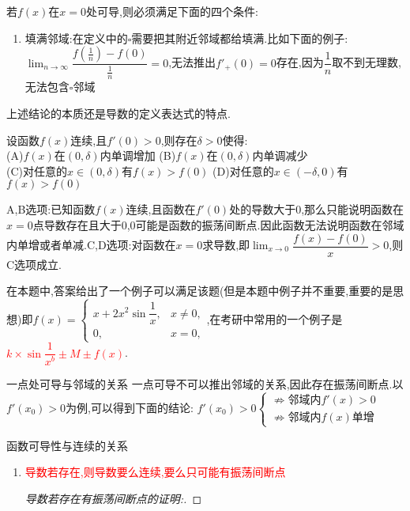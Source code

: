 \documentclass[8pt a4paper, oneside, UTF8]{ctexbook}  %
\begin{document}
\begin{sloppypar}
\begin{conclusion}{若$f(x)$在$x=0$处可导,则必须满足下面的四个条件:}{}
\begin{enumerate}
            \item 填满邻域:在定义中的$\square$需要把其附近邻域都给填满.比如下面的例子:$\lim_{n\to \infty}\dfrac{f(\frac{1}{n})-f(0)}{\frac{1}{n}}=0$,无法推出$f'_+(0)=0$存在,因为$\dfrac{1}{n}$取不到无理数,无法包含$\square$邻域
        \end{enumerate}
        上述结论的本质还是导数的定义表达式的特点.
    \end{conclusion}
    \begin{problem}
    设函数$f(x)$连续,且$f'(0)>0$,则存在$\delta >0 $使得:\\
    (A)$f(x)$在$(0,\delta)$内单调增加 \quad (B)$f(x)$在$(0,\delta)$内单调减少\\
    (C)对任意的$x \in (0,\delta)$有$f(x)>f(0)$ \quad    (D)对任意的$x\in (-\delta,0)$有$f(x)>f(0)$
    \end{problem}
    \begin{solution}
        A,B选项:已知函数$f(x)$连续,且函数在$f'(0)$处的导数大于0,那么只能说明函数在$x=0$点导数存在且大于0,0可能是函数的振荡间断点.因此函数无法说明函数在邻域内单增或者单减.C,D选项:对函数在$x=0$求导数,即$\lim_{x\to 0} \dfrac{f(x)-f(0)}{x}>0$,则C选项成立.
    \end{solution}
    \begin{note}
        在本题中,答案给出了一个例子可以满足该题(但是本题中例子并不重要,重要的是思想)即$f\left(x\right)=\left\{\begin{matrix}x+2x^{2}\sin\dfrac{1}{x},&x\neq0,\\0,&x=0,\end{matrix}\right.$,在考研中常用的一个例子是\textcolor{red}{$k \times \sin \dfrac{1}{x^b}\pm M \pm f(x)$}.
    \end{note}
    \begin{lemma}{一点处可导与邻域的关系}{}
        一点可导不可以推出邻域的关系,因此存在振荡间断点.以$f'(x_0)>0$为例,可以得到下面的结论:
        $f'(x_0)>0\begin{cases}
                \nRightarrow \text{邻域内}f'(x)>0 \\
                \nRightarrow \text{邻域内}f(x)\text{单增}
            \end{cases}$
    \end{lemma}
    \begin{criterion}{函数可导性与连续的关系}{}
        \begin{enumerate}
            \item \textcolor{red}{导数若存在,则导数要么连续,要么只可能有振荡间断点}
                  \begin{proof}[导数若存在有振荡间断点的证明:]

\end{proof}
\end{enumerate}
\end{criterion}
\end{sloppypar}
\end{document}
